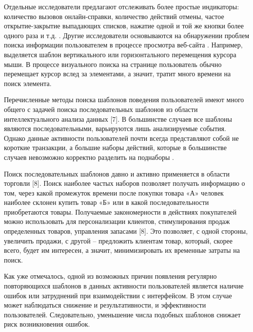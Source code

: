 Отдельные исследователи предлагают отслеживать более простые индикаторы: количество вызовов онлайн-справки, количество действий отмены, частое открытие-закрытие выпадающих списков, нажатие одной и той же кнопки более одного раза и т.д. \cite{5}. Другие исследователи основываются на обнаружении проблем поиска информации пользователем в процессе просмотра веб-сайта \cite{6}. Например, выделяется шаблон вертикального или горизонтального перемещения курсора мыши. В процессе визуального поиска на странице пользователь обычно перемещает курсор вслед за элементами, а значит, тратит много времени на поиск элемента.

Перечисленные методы поиска шаблонов поведения пользователей имеют много общего с задачей поиска последовательных шаблонов из области интеллектуального анализа данных [7]. В большинстве случаев все шаблоны являются последовательными, варьируются лишь анализируемые события. Однако данные активности пользователей почти всегда представляют собой не короткие транзакции, а большие наборы действий, которые в большинстве случаев невозможно корректно разделить на поднаборы \cite{2,3}.

Поиск последовательных шаблонов давно и активно применяется в области торговли [8]. Поиск наиболее частых наборов позволяет получать
информацию о том, через какой промежуток времени после покупки товара «А» человек наиболее склонен купить товар «Б» или в какой последовательности приобретаются товары. Получаемые закономерности в действиях покупателей можно использовать для персонализации клиентов, стимулирования продаж определенных товаров, управления запасами [8]. Это позволяет, с одной стороны, увеличить продажи, с другой – предложить клиентам товар, который, скорее всего, будет им интересен, а значит, минимизировать их временные затраты на поиск.


Как уже отмечалось, одной из возможных причин появления регулярно повторяющихся шаблонов в данных активности пользователей является
наличие ошибок или затруднений при взаимодействии с интерфейсом. В этом случае может наблюдаться снижение и результативности, и эффективности пользователей. Следовательно, уменьшение числа подобных шаблонов снижает риск возникновения ошибок.

